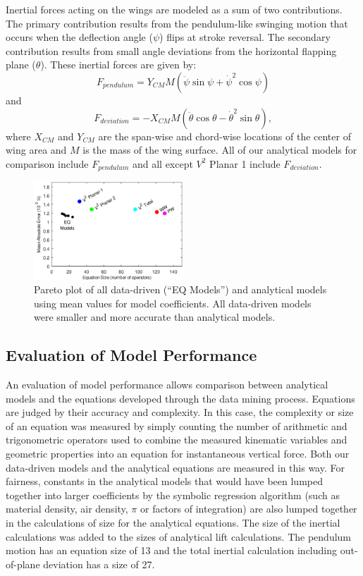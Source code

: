 \documentclass{article}
\begin{document}
Inertial forces acting on the wings are modeled as a sum of two contributions.
The primary contribution results from the pendulum-like swinging motion that
occurs when the deflection angle ($\psi$) flips at stroke reversal.  The
secondary contribution results from small angle deviations from the horizontal
flapping plane ($\theta$). These inertial forces are given by:
\begin{equation}\label{sdbla}
F_{pendulum} = Y_{CM}M(\ddot{\psi}\sin\psi + \dot{\psi}^2\cos\psi)
\end{equation}
and
\begin{equation}\label{sdbla2}
F_{deviation} = -X_{CM}M(\ddot{\theta}\cos\theta - \dot{\theta}^2\sin\theta),
\end{equation}
\noindent where \(X_{CM}\) and \(Y_{CM}\) are the span-wise and chord-wise
locations of the center of wing area and \(M\) is the mass of the wing surface.
All of our analytical models for comparison include $F_{pendulum}$ and all
except $V^2$ Planar 1 include $F_{deviation}$.

\begin{figure}
\centering
\includegraphics[width=0.5\textwidth]{figures/mae_nofit}
\caption{Pareto plot of all data-driven (``EQ Models'') and analytical models
  using mean values for model coefficients. All data-driven models were smaller
  and more accurate than analytical models.\label{fig:pareto_mae}}
\end{figure}

\subsection*{Evaluation of Model Performance}
An evaluation of model performance allows comparison between analytical models
and the equations developed through the data mining process.  Equations are
judged by their accuracy and complexity.  In this case, the complexity or size
of an equation was measured by simply counting the number of arithmetic and
trigonometric operators used to combine the measured kinematic variables and
geometric properties into an equation for instantaneous vertical force.  Both
our data-driven models and the analytical equations are measured in this way.
For fairness, constants in the analytical models that would have been lumped
together into larger coefficients by the symbolic regression algorithm (such as
material density, air density, \(\pi\) or factors of integration) are also
lumped together in the calculations of size for the analytical equations. The
size of the inertial calculations was added to the sizes of analytical lift
calculations.  The pendulum motion has an equation size of 13 and the total
inertial calculation including out-of-plane deviation has a size of 27.
\end{document}
